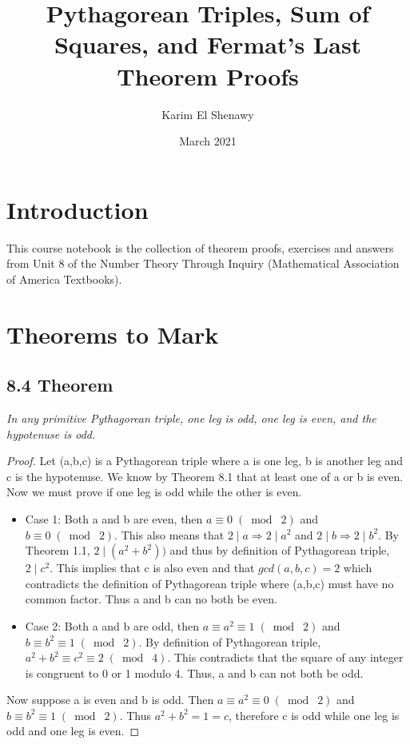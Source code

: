 \documentclass{article}
\title{Pythagorean Triples, Sum of Squares, and Fermat's Last Theorem Proofs}
\author{Karim El Shenawy}
\date{March 2021}
\begin{document}
\maketitle

\section*{Introduction}
This course notebook is the collection of theorem proofs, exercises and answers from Unit 8 of the Number Theory Through Inquiry (Mathematical Association of America Textbooks).

\section*{Theorems to Mark}

\subsection*{8.4 Theorem} 
\quad \textit{In any primitive Pythagorean triple, one leg is odd, one leg is even, and the hypotenuse is odd.}

\begin{proof}
Let (a,b,c) is a Pythagorean triple where a is one leg, b is another leg and c is the hypotenuse. We know by Theorem 8.1 that at least one of a or b is even. Now we must prove if one leg is odd while the other is even.
\begin{itemize}
    \item Case 1: Both a and b are even, then $a \equiv 0 \;(\bmod\; 2)$ and $b \equiv 0 \;(\bmod\; 2)$. This also means that $2 \mid a \Longrightarrow 2 \mid a^2$ and $2 \mid b \Longrightarrow 2 \mid b^2$. By Theorem 1.1, $2 \mid (a^2 + b^2))$ and thus by definition of Pythagorean triple,$2 \mid c^2$. This implies that c is also even and that $gcd(a,b,c) = 2$ which contradicts the definition of Pythagorean triple where (a,b,c) must have no common factor. Thus a and b can no both be even.
    \item Case 2: Both a and b are odd, then $a \equiv a^2 \equiv 1 \;(\bmod\; 2)$ and $b \equiv b^2 \equiv 1 \;(\bmod\; 2)$. By definition of Pythagorean triple, $a^2 + b^2 \equiv c^2 \equiv 2 \;(\bmod\; 4)$. This contradicts that the square of any integer is congruent to 0 or 1 modulo 4. Thus, a and b can not both be odd.
\end{itemize}
Now suppose a is even and b is odd. Then $a \equiv a^2 \equiv 0 \;(\bmod\; 2)$ and $b \equiv b^2 \equiv 1 \;(\bmod\; 2)$. Thus $a^2 + b^2 = 1 = c$, therefore c is odd while one leg is odd and one leg is even.
\end{proof}
\end{document}
